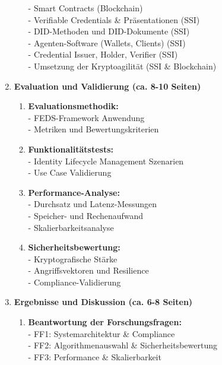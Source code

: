 \begin{enumerate}[label=\textbf{\arabic*.}]
\begin{enumerate}[label=\textbf{4.\arabic*}]
        - Smart Contracts (Blockchain) \\
        - Verifiable Credentials \& Präsentationen (\ac{SSI}) \\
        - \ac{DID}-Methoden und \ac{DID}-Dokumente (\ac{SSI})\\
        - Agenten-Software (Wallets, Clients) (\ac{SSI})\\
        - Credential Issuer, Holder, Verifier (\ac{SSI})\\
        - Umsetzung der Kryptoagilität (\ac{SSI} \& Blockchain)
    \end{enumerate}
    \item \textbf{Evaluation und Validierung (ca. 8-10 Seiten)}
    \begin{enumerate}[label=\textbf{5.\arabic*}]
        \item \textbf{Evaluationsmethodik:} \\
        - \ac{FEDS}-Framework Anwendung \\
        - Metriken und Bewertungskriterien
        \item \textbf{Funktionalitätstests:} \\
        - Identity Lifecycle Management Szenarien \\
        - Use Case Validierung
        \item \textbf{Performance-Analyse:} \\
        - Durchsatz und Latenz-Messungen \\
        - Speicher- und Rechenaufwand \\
        - Skalierbarkeitsanalyse
        \item \textbf{Sicherheitsbewertung:} \\
        - Kryptografische Stärke \\
        - Angriffsvektoren und Resilience \\
        - Compliance-Validierung
    \end{enumerate}
    \pagebreak
    \item \textbf{Ergebnisse und Diskussion (ca. 6-8 Seiten)}
    \begin{enumerate}[label=\textbf{6.\arabic*}]
        \item \textbf{Beantwortung der Forschungsfragen:} \\
        - FF1: Systemarchitektur \& Compliance \\
        - FF2: Algorithmenauswahl \& Sicherheitsbewertung \\
        - FF3: Performance \& Skalierbarkeit \\

\end{enumerate}
\end{enumerate}
